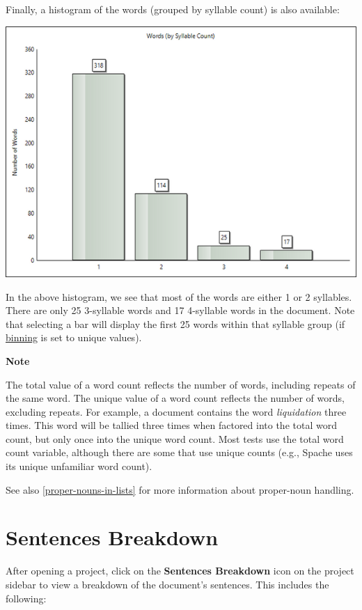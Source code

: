 \documentclass[
]{book}
\newenvironment{notesection}
    {
    \begin{tcolorbox}[colframe=mediumblue,colback=lightblue,coltext=mediumblue,arc=3mm]
    \faLightbulb[regular] \textbf{Note} \newline
    }
    {
    \end{tcolorbox}
    }
\theoremstyle{definition}
\theoremstyle{definition}
\theoremstyle{definition}
\theoremstyle{definition}
\theoremstyle{remark}
\begin{document}
Finally, a histogram of the words (grouped by syllable count) is also available:

\begin{center}\includegraphics[width=0.75\linewidth,]{Images/SyllableCountHistogram} \end{center}

In the above histogram, we see that most of the words are either 1 or 2 syllables. There are only 25 3-syllable words and 17 4-syllable words in the document. Note that selecting a bar will display the first 25 words within that syllable group (if \protect\hyperlink{options-histograms}{binning} is set to unique values).

\begin{notesection}
The total value of a word count reflects the number of words, including repeats of the same word. The unique value of a word count reflects the number of words, excluding repeats. For example, a document contains the word \emph{liquidation} three times. This word will be tallied three times when factored into the total word count, but only once into the unique word count. Most tests use the total word count variable, although there are some that use unique counts (e.g., Spache uses its unique unfamiliar word count).

\end{notesection}

See also \ref{proper-nouns-in-lists} for more information about proper-noun handling.

\hypertarget{reviewing-sentences-breakdown}{%
\section{Sentences Breakdown}\label{reviewing-sentences-breakdown}}

After opening a project, click on the \textbf{Sentences Breakdown} icon on the project sidebar to view a breakdown of the document's sentences. This includes the following:
\end{document}
